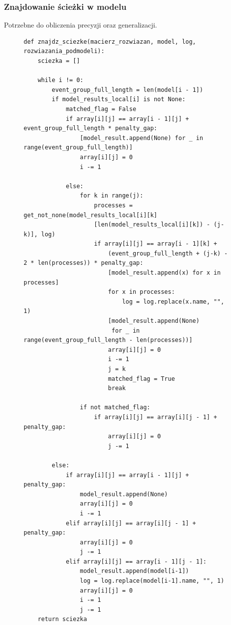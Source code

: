 \subsubsection{Znajdowanie ścieżki w modelu}
Potrzebne do obliczenia precyzji oraz generalizacji.
\begin{figure}[!ht]
\lstset{caption=Znajdowanie ścieżki w modelu, captionpos=b}
\lstset{label=src:traceback, frame=single}
\begin{lstlisting}
def znajdz_sciezke(macierz_rozwiazan, model, log, rozwiazania_podmodeli):
    sciezka = []

    while i != 0:
        event_group_full_length = len(model[i - 1])
        if model_results_local[i] is not None:
            matched_flag = False
            if array[i][j] == array[i - 1][j] + event_group_full_length * penalty_gap:
                [model_result.append(None) for _ in range(event_group_full_length)]
                array[i][j] = 0
                i -= 1

            else:
                for k in range(j):
                    processes = get_not_none(model_results_local[i][k]
                    [len(model_results_local[i][k]) - (j-k)], log)
                    if array[i][j] == array[i - 1][k] + 
                    	(event_group_full_length + (j-k) - 2 * len(processes)) * penalty_gap:
                        [model_result.append(x) for x in processes]
                        for x in processes:
                            log = log.replace(x.name, "", 1)
                        [model_result.append(None) 
                         for _ in range(event_group_full_length - len(processes))]
                        array[i][j] = 0
                        i -= 1
                        j = k
                        matched_flag = True
                        break

                if not matched_flag:
                    if array[i][j] == array[i][j - 1] + penalty_gap:
                        array[i][j] = 0
                        j -= 1

        else:
            if array[i][j] == array[i - 1][j] + penalty_gap:
                model_result.append(None)
                array[i][j] = 0
                i -= 1
            elif array[i][j] == array[i][j - 1] + penalty_gap:
                array[i][j] = 0
                j -= 1
            elif array[i][j] == array[i - 1][j - 1]:
                model_result.append(model[i-1])
                log = log.replace(model[i-1].name, "", 1)
                array[i][j] = 0
                i -= 1
                j -= 1
    return sciezka
\end{lstlisting}
\end{figure}

